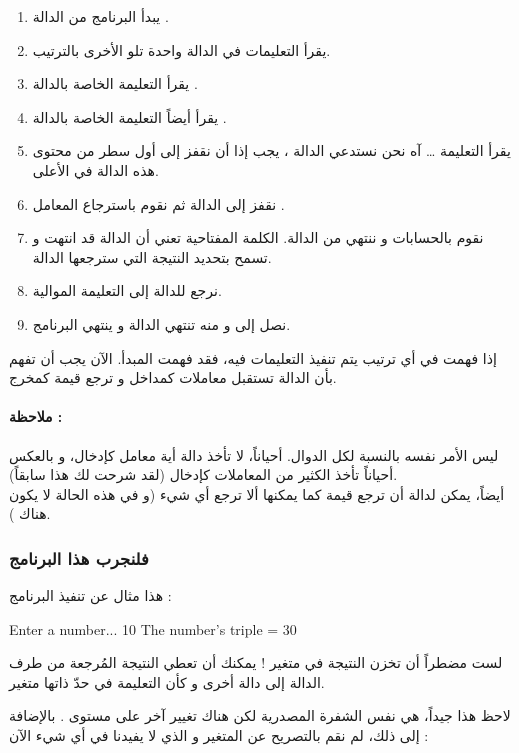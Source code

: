 \begin{enumerate}
	\item يبدأ البرنامج من الدالة
	.
	\item يقرأ التعليمات في الدالة واحدة تلو الأخرى بالترتيب.
	\item يقرأ التعليمة الخاصة بالدالة
	.
	\item يقرأ أيضاً التعليمة الخاصة بالدالة 
	.
	\item يقرأ التعليمة
	\dots
	آه نحن نستدعي الدالة 
	،
	يجب إذا أن نقفز إلى أول سطر من محتوى هذه الدالة في الأعلى.
	\item نقفز إلى الدالة
	 ثم نقوم باسترجاع المعامل
	.
	\item نقوم بالحسابات و ننتهي من الدالة. الكلمة المفتاحية 
	تعني أن الدالة قد انتهت و تسمح بتحديد النتيجة التي سترجعها الدالة.
	\item نرجع للدالة 
	إلى التعليمة الموالية.
	\item نصل إلى 
	و منه تنتهي الدالة
	و ينتهي البرنامج.
\end{enumerate}

إذا فهمت في أي ترتيب يتم تنفيذ التعليمات فيه، فقد فهمت المبدأ. الآن يجب أن تفهم بأن الدالة تستقبل معاملات كمداخل و ترجع قيمة كمخرج.


\paragraph{ملاحظة :}

ليس الأمر نفسه بالنسبة لكل الدوال. أحياناً، لا تأخذ دالة أية معامل كإدخال، و بالعكس أحياناً تأخذ الكثير من المعاملات كإدخال (لقد شرحت لك هذا سابقاً).\\
أيضاً، يمكن لدالة أن ترجع قيمة كما يمكنها ألا ترجع أي شيء (و في هذه الحالة لا يكون هناك
).

\subsubsection{فلنجرب هذا البرنامج}

هذا مثال عن تنفيذ البرنامج :

\begin{Console}
Enter a number... 10
The number's triple = 30
\end{Console}

\begin{information}
لست مضطراً أن تخزن النتيجة في متغير ! يمكنك أن تعطي النتيجة المُرجعة من طرف الدالة 
إلى دالة أخرى و كأن التعليمة
في حدّ ذاتها متغير.
\end{information}
لاحظ هذا جيداً، هي نفس الشفرة المصدرية لكن هناك تغيير آخر على مستوى 
.
بالإضافة إلى ذلك، لم نقم بالتصريح عن المتغير 
و الذي لا يفيدنا في أي شيء الآن :

